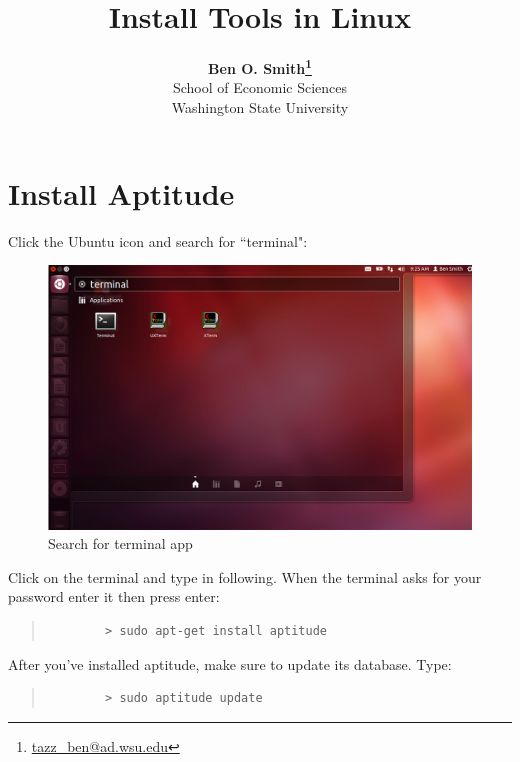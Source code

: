 \documentclass[11pt]{article}
\begin{document}
 

\title{Install Tools in Linux}
\date{}
\author{\textbf{Ben O. Smith\footnote{\href{mailto:tazz_ben@ad.wsu.edu}{tazz\_ben@ad.wsu.edu}}} \\
School of Economic Sciences \\
Washington State University}
\maketitle \doublespace

\section{Install Aptitude}

Click the Ubuntu icon and search for ``terminal":

\begin{figure}[!h]
	\centering
	\includegraphics[width=5in]{graphics/OpenTerminal.png}	\caption{Search for terminal app}
\end{figure}

Click on the terminal and type in following. When the terminal asks for your password enter it then press enter:

\begin{quote}
	\begin{verbatim}
		> sudo apt-get install aptitude
	\end{verbatim}
\end{quote}

After you've installed aptitude, make sure to update its database. Type:

\begin{quote}
	\begin{verbatim}
		> sudo aptitude update
	\end{verbatim}
\end{quote}
\end{document}
